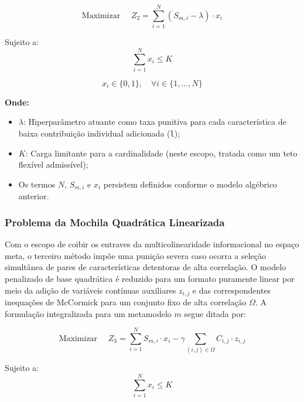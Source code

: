 \documentclass[12pt]{article}
\begin{document}
\begin{equation} \label{eq:obj_knapsack}
\text{Maximizar } \quad Z_2 = \sum_{i=1}^{N} (S_{m,i} - \lambda) \cdot x_i
\end{equation}

Sujeito a:
\begin{equation} \label{eq:rest_knapsack}
\sum_{i=1}^{N} x_i \le K
\end{equation}

\begin{equation}
x_i \in \{0, 1\}, \quad \forall i \in \{1, \dots, N\}
\end{equation}

\noindent \textbf{Onde:}
\begin{itemize}
    \itemsep0em
    \item $\lambda$: Hiperparâmetro atuante como taxa punitiva para cada característica de baixa contribuição individual adicionada (\texttt{l});
    \item $K$: Carga limitante para a cardinalidade (neste escopo, tratada como um teto flexível admissível);
    \item Os termos $N$, $S_{m,i}$ e $x_i$ persistem definidos conforme o modelo algébrico anterior.
\end{itemize}


\subsubsection{Problema da Mochila Quadrática Linearizada}

Com o escopo de coibir os entraves da multicolinearidade informacional no espaço meta, o terceiro método impõe uma punição severa caso ocorra a seleção simultânea de pares de características detentoras de alta correlação. O modelo penalizado de base quadrática é reduzido para um formato puramente linear por meio da adição de variáveis contínuas auxiliares $z_{i,j}$ e das correspondentes inequações de McCormick para um conjunto fixo de alta correlação $\Omega$. A formulação integralizada para um metamodelo $m$ segue ditada por:

\begin{equation} \label{eq:obj_quad}
\text{Maximizar } \quad Z_3 = \sum_{i=1}^{N} S_{m,i} \cdot x_i - \gamma \sum_{(i,j) \in \Omega} C_{i,j} \cdot z_{i,j}
\end{equation}

Sujeito a:
\begin{equation} \label{eq:rest_quad}
\sum_{i=1}^{N} x_i \le K
\end{equation}
\end{document}
